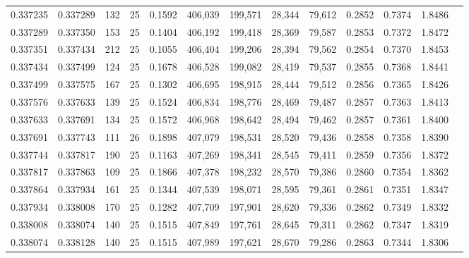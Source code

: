 \begin{tabular}{rrrrrrrrrrrrr}
0.337235 & 0.337289 &   132 &  25 &                                     0.1592 & 406,039 & 199,571 &  28,344 &  79,612 & 0.2852 & 0.7374 & 1.8486 \\
0.337289 & 0.337350 &   153 &  25 &                                     0.1404 & 406,192 & 199,418 &  28,369 &  79,587 & 0.2853 & 0.7372 & 1.8472 \\
0.337351 & 0.337434 &   212 &  25 &                                     0.1055 & 406,404 & 199,206 &  28,394 &  79,562 & 0.2854 & 0.7370 & 1.8453 \\
0.337434 & 0.337499 &   124 &  25 &                                     0.1678 & 406,528 & 199,082 &  28,419 &  79,537 & 0.2855 & 0.7368 & 1.8441 \\
0.337499 & 0.337575 &   167 &  25 &                                     0.1302 & 406,695 & 198,915 &  28,444 &  79,512 & 0.2856 & 0.7365 & 1.8426 \\
0.337576 & 0.337633 &   139 &  25 &                                     0.1524 & 406,834 & 198,776 &  28,469 &  79,487 & 0.2857 & 0.7363 & 1.8413 \\
0.337633 & 0.337691 &   134 &  25 &                                     0.1572 & 406,968 & 198,642 &  28,494 &  79,462 & 0.2857 & 0.7361 & 1.8400 \\
0.337691 & 0.337743 &   111 &  26 &                                     0.1898 & 407,079 & 198,531 &  28,520 &  79,436 & 0.2858 & 0.7358 & 1.8390 \\
0.337744 & 0.337817 &   190 &  25 &                                     0.1163 & 407,269 & 198,341 &  28,545 &  79,411 & 0.2859 & 0.7356 & 1.8372 \\
0.337817 & 0.337863 &   109 &  25 &                                     0.1866 & 407,378 & 198,232 &  28,570 &  79,386 & 0.2860 & 0.7354 & 1.8362 \\
0.337864 & 0.337934 &   161 &  25 &                                     0.1344 & 407,539 & 198,071 &  28,595 &  79,361 & 0.2861 & 0.7351 & 1.8347 \\
0.337934 & 0.338008 &   170 &  25 &                                     0.1282 & 407,709 & 197,901 &  28,620 &  79,336 & 0.2862 & 0.7349 & 1.8332 \\
0.338008 & 0.338074 &   140 &  25 &                                     0.1515 & 407,849 & 197,761 &  28,645 &  79,311 & 0.2862 & 0.7347 & 1.8319 \\
0.338074 & 0.338128 &   140 &  25 &                                     0.1515 & 407,989 & 197,621 &  28,670 &  79,286 & 0.2863 & 0.7344 & 1.8306 \\

\end{tabular}
